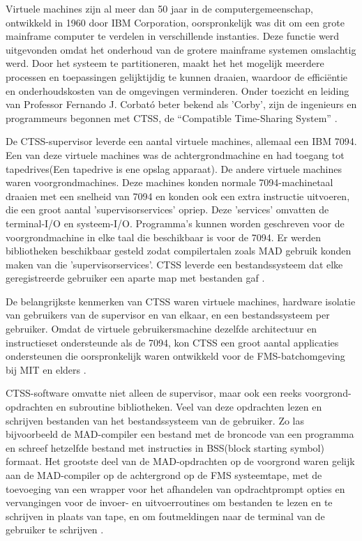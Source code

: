 Virtuele machines zijn al meer dan 50 jaar in de computergemeenschap, ontwikkeld in 1960 door IBM Corporation, oorspronkelijk was dit om een grote mainframe computer te verdelen in verschillende instanties. Deze functie werd uitgevonden omdat het onderhoud van de grotere mainframe systemen omslachtig werd. Door het systeem te partitioneren, maakt het het mogelijk meerdere processen en toepassingen gelijktijdig te kunnen draaien, waardoor de efficiëntie en onderhoudskosten van de omgevingen verminderen. Onder toezicht en leiding van Professor Fernando J. Corbató beter bekend als 'Corby', zijn de ingenieurs en programmeurs begonnen met CTSS, de “Compatible Time-Sharing System” \autocite{Ameen2013}.

De CTSS-supervisor leverde een aantal virtuele machines, allemaal een IBM 7094. Een van deze virtuele machines was de achtergrondmachine en had toegang tot tapedrives(Een tapedrive is ene opslag apparaat). De andere virtuele machines waren voorgrondmachines. Deze machines konden normale 7094-machinetaal draaien met een snelheid van 7094 en konden ook een extra instructie uitvoeren, die een groot aantal 'supervisorservices' opriep. Deze 'services' omvatten de terminal-I/O en systeem-I/O. Programma's kunnen worden geschreven voor de voorgrondmachine in elke taal die beschikbaar is voor de 7094. Er werden bibliotheken beschikbaar gesteld zodat compilertalen zoals MAD gebruik konden maken van die 'supervisorservices'. CTSS leverde een bestandssysteem dat elke geregistreerde gebruiker een aparte map met bestanden gaf \autocite{VanVleck2015}.

De belangrijkste kenmerken van CTSS waren virtuele machines, hardware isolatie van gebruikers van de supervisor en van elkaar, en een bestandssysteem per gebruiker. Omdat de virtuele gebruikersmachine dezelfde architectuur en instructieset ondersteunde als de 7094, kon CTSS een groot aantal applicaties ondersteunen die oorspronkelijk waren ontwikkeld voor de FMS-batchomgeving bij MIT en elders \autocite{VanVleck2015}.

CTSS-software omvatte niet alleen de supervisor, maar ook een reeks voorgrond-opdrachten en subroutine bibliotheken. Veel van deze  opdrachten lezen en schrijven bestanden van het bestandssysteem van de gebruiker. Zo las bijvoorbeeld de MAD-compiler een bestand met de broncode van een programma en schreef hetzelfde bestand met instructies in BSS(block starting symbol) formaat. Het grootste deel van de MAD-opdrachten op de voorgrond waren gelijk aan de MAD-compiler op de achtergrond op de FMS systeemtape, met de toevoeging van een wrapper voor het afhandelen van opdrachtprompt opties en vervangingen voor de invoer- en uitvoerroutines om bestanden te lezen en te schrijven in plaats van tape, en om foutmeldingen naar de terminal van de gebruiker te schrijven \autocite{VanVleck2015}.


